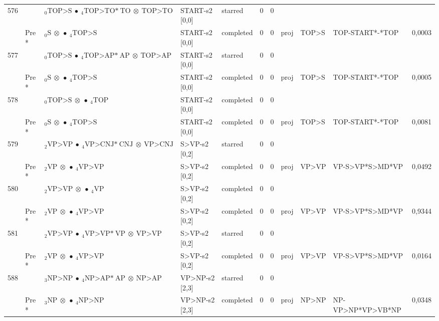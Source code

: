 \documentclass[10pt]{article}
\begin{document}
\begin{longtable}[htbp]{lllllllllll}
576 & & $ {}_0 \textrm{TOP>S} \  \bullet \ {}_{4} \textrm{TOP>TO*} \ \textrm{TO} \  \otimes \ \textrm{TOP>TO} $ & START-s2 [0,0] & starred & 0 & 0 & & & & \\ 
 & Pre *& $ {}_0 \textrm{S} \  \otimes \  \bullet \ {}_{4} \textrm{TOP>S} $ & START-s2 [0,0] & completed & 0 & 0 & proj & TOP>S & TOP-START*-*TOP & 0,0003 \\ 
577 & & $ {}_0 \textrm{TOP>S} \  \bullet \ {}_{4} \textrm{TOP>AP*} \ \textrm{AP} \  \otimes \ \textrm{TOP>AP} $ & START-s2 [0,0] & starred & 0 & 0 & & & & \\ 
 & Pre *& $ {}_0 \textrm{S} \  \otimes \  \bullet \ {}_{4} \textrm{TOP>S} $ & START-s2 [0,0] & completed & 0 & 0 & proj & TOP>S & TOP-START*-*TOP & 0,0005 \\ 
578 & & $ {}_0 \textrm{TOP>S} \  \otimes \  \bullet \ {}_{4} \textrm{TOP} $ & START-s2 [0,0] & completed & 0 & 0 & & & & \\ 
 & Pre *& $ {}_0 \textrm{S} \  \otimes \  \bullet \ {}_{4} \textrm{TOP>S} $ & START-s2 [0,0] & completed & 0 & 0 & proj & TOP>S & TOP-START*-*TOP & 0,0081 \\ 
579 & & $ {}_2 \textrm{VP>VP} \  \bullet \ {}_{4} \textrm{VP>CNJ*} \ \textrm{CNJ} \  \otimes \ \textrm{VP>CNJ} $ & S>VP-s2 [0,2] & starred & 0 & 0 & & & & \\ 
 & Pre *& $ {}_2 \textrm{VP} \  \otimes \  \bullet \ {}_{4} \textrm{VP>VP} $ & S>VP-s2 [0,2] & completed & 0 & 0 & proj & VP>VP & VP-S>VP*S>MD*VP & 0,0492 \\ 
580 & & $ {}_2 \textrm{VP>VP} \  \otimes \  \bullet \ {}_{4} \textrm{VP} $ & S>VP-s2 [0,2] & completed & 0 & 0 & & & & \\ 
 & Pre *& $ {}_2 \textrm{VP} \  \otimes \  \bullet \ {}_{4} \textrm{VP>VP} $ & S>VP-s2 [0,2] & completed & 0 & 0 & proj & VP>VP & VP-S>VP*S>MD*VP & 0,9344 \\ 
581 & & $ {}_2 \textrm{VP>VP} \  \bullet \ {}_{4} \textrm{VP>VP*} \ \textrm{VP} \  \otimes \ \textrm{VP>VP} $ & S>VP-s2 [0,2] & starred & 0 & 0 & & & & \\ 
 & Pre *& $ {}_2 \textrm{VP} \  \otimes \  \bullet \ {}_{4} \textrm{VP>VP} $ & S>VP-s2 [0,2] & completed & 0 & 0 & proj & VP>VP & VP-S>VP*S>MD*VP & 0,0164 \\ 
588 & & $ {}_3 \textrm{NP>NP} \  \bullet \ {}_{4} \textrm{NP>AP*} \ \textrm{AP} \  \otimes \ \textrm{NP>AP} $ & VP>NP-s2 [2,3] & starred & 0 & 0 & & & & \\ 
 & Pre *& $ {}_3 \textrm{NP} \  \otimes \  \bullet \ {}_{4} \textrm{NP>NP} $ & VP>NP-s2 [2,3] & completed & 0 & 0 & proj & NP>NP & NP-VP>NP*VP>VB*NP & 0,0348 \\ 

\end{longtable}
\end{document}
